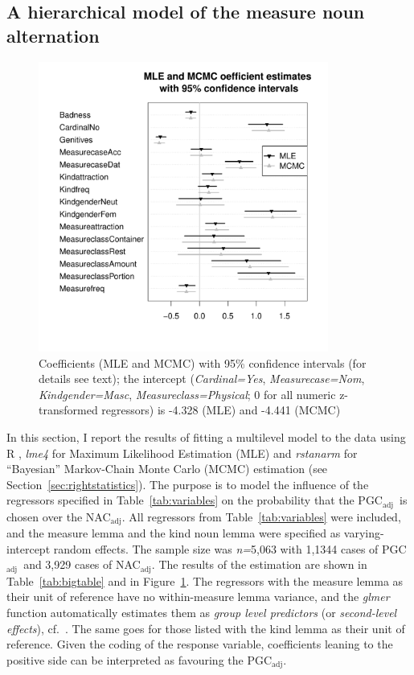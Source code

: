 \documentclass[USenglish]{article}
\newcommand{\Sub}[1]{\ensuremath{\mathrm{_{#1}}}}
\newcommand{\NACa}{NAC\Sub{adj}}
\newcommand{\PGCa}{PGC\Sub{adj}}
\begin{document}
\subsection{A hierarchical model of the measure noun alternation}
\label{sec:corpushierarchicalmodel}

\begin{figure}[hb!]
  \centering
  \includegraphics[width=0.85\textwidth]{../R/output/corpus_fixeffs_mle+mcmc}
  \caption{Coefficients (MLE and MCMC) with 95\% confidence intervals (for details see text); the intercept (\textit{Cardinal=Yes}, \textit{Measurecase=Nom}, \textit{Kindgender=Masc}, \textit{Measureclass=Physical}; 0 for all numeric z-transformed regressors) is -4.328 (MLE) and -4.441 (MCMC)}
  \label{fig:fixeffs}
\end{figure}

In this section, I report the results of fitting a multilevel model to the data using R \citep{R}, \textit{lme4} \citep{lme4} for Maximum Likelihood Estimation (MLE) and \textit{rstanarm} \citep{rstanarm} for ``Bayesian'' Markov-Chain Monte Carlo (MCMC) estimation (see Section~\ref{sec:rightstatistics}).
The purpose is to model the influence of the regressors specified in Table~\ref{tab:variables} on the probability that the \PGCa\ is chosen over the \NACa.
All regressors from Table~\ref{tab:variables} were included, and the measure lemma and the kind noun lemma were specified as varying-intercept random effects.
The sample size was \textit{n=}5,063 with 1,1344 cases of \PGCa\ and 3,929 cases of \NACa.
The results of the estimation are shown in Table~\ref{tab:bigtable} and in Figure~\ref{fig:fixeffs}.
The regressors with the measure lemma as their unit of reference have no within-measure lemma variance, and the \textit{glmer} function automatically estimates them as \textit{group level predictors} (or \textit{second-level effects}), cf.\ \citet[265--269,302--304]{GelmanHill2006}.
The same goes for those listed with the kind lemma as their unit of reference.
Given the coding of the response variable, coefficients leaning to the positive side can be interpreted as favouring the \PGCa.
\end{document}
